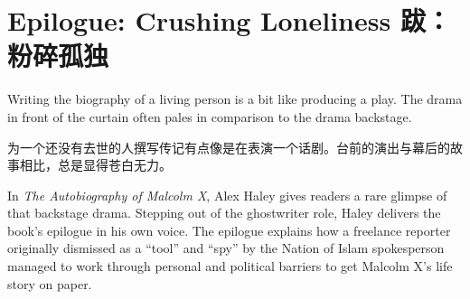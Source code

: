 

\chapter{\ifdefined\eng
Epilogue: Crushing Loneliness
\fi
\ifdefined\chs
跋：粉碎孤独
\fi}
\ifdefined\eng
{}
\fi
\thispagestyle{empty}


\ifdefined\eng
Writing the biography of a living person is a bit like producing a play. The drama in front of the curtain often pales in comparison to the drama backstage.
\fi

\ifdefined\chs
为一个还没有去世的人撰写传记有点像是在表演一个话剧。台前的演出与幕后的故事相比，总是显得苍白无力。
\fi

\ifdefined\eng
In \textit{The Autobiography of Malcolm X}, Alex Haley gives readers a rare glimpse of that backstage drama. Stepping out of the ghostwriter role, Haley delivers the book's epilogue in his own voice. The epilogue explains how a freelance reporter originally dismissed as a ``tool'' and ``spy'' by the Nation of Islam spokesperson managed to work through personal and political barriers to get Malcolm X's life story on paper.
\fi

